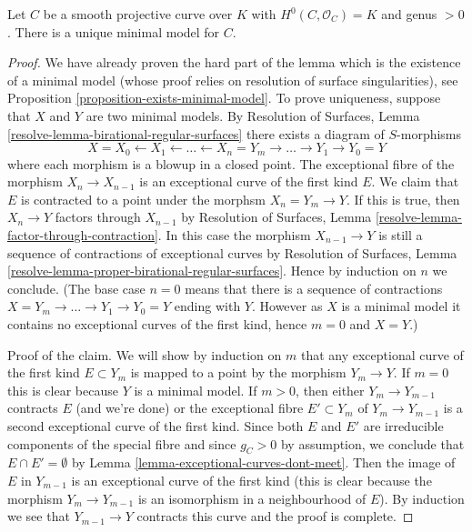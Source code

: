\begin{lemma}
\label{lemma-minimal-model-unique}
Let $C$ be a smooth projective curve over $K$ with
$H^0(C, \mathcal{O}_C) = K$ and genus $> 0$.
There is a unique minimal model for $C$.
\end{lemma}

\begin{proof}
We have already proven the hard part of the lemma which is the existence
of a minimal model (whose proof relies on
resolution of surface singularities), see
Proposition \ref{proposition-exists-minimal-model}.
To prove uniqueness, suppose that $X$ and $Y$ are two
minimal models. By
Resolution of Surfaces, Lemma \ref{resolve-lemma-birational-regular-surfaces}
there exists a diagram of $S$-morphisms
$$
X = X_0 \leftarrow X_1 \leftarrow \ldots \leftarrow X_n = Y_m
\to \ldots \to Y_1 \to Y_0 = Y
$$
where each morphism is a blowup in a closed point. The
exceptional fibre of the morphism $X_n \to X_{n - 1}$ is an
exceptional curve of the first kind $E$. We claim that $E$ is
contracted to a point under the morphsm $X_n = Y_m \to Y$.
If this is true, then $X_n \to Y$ factors through $X_{n - 1}$ by
Resolution of Surfaces, Lemma \ref{resolve-lemma-factor-through-contraction}.
In this case the morphism $X_{n - 1} \to Y$ is still a sequence of
contractions of exceptional curves by
Resolution of Surfaces, Lemma
\ref{resolve-lemma-proper-birational-regular-surfaces}.
Hence by induction on $n$ we conclude. (The base case $n = 0$ means
that there is a sequence of contractions
$X = Y_m \to \ldots \to Y_1 \to Y_0 = Y$
ending with $Y$. However as $X$ is a minimal model it contains
no exceptional curves of the first kind, hence $m = 0$ and $X = Y$.)

\medskip\noindent
Proof of the claim. We will show by induction on $m$ that any exceptional
curve of the first kind $E \subset Y_m$ is mapped to a point
by the morphism $Y_m \to Y$. If $m = 0$ this is clear because
$Y$ is a minimal model. If $m > 0$, then either
$Y_m \to Y_{m - 1}$ contracts $E$ (and we're done) or
the exceptional fibre $E' \subset Y_m$ of $Y_m \to Y_{m - 1}$
is a second exceptional curve of the first kind.
Since both $E$ and $E'$ are irreducible components of the special
fibre and since $g_C > 0$ by assumption, we conclude that
$E \cap E' = \emptyset$ by
Lemma \ref{lemma-exceptional-curves-dont-meet}.
Then the image of $E$ in $Y_{m - 1}$ is an exceptional
curve of the first kind (this is clear because the morphism
$Y_m \to Y_{m - 1}$ is an isomorphism in a neighbourhood of $E$).
By induction we see that $Y_{m - 1} \to Y$ contracts this curve
and the proof is complete.
\end{proof}

